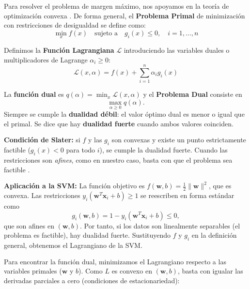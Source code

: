 \documentclass[12pt, a4paper]{article}
\begin{document}
\begin{tcolorbox}[colback=teal!5!white,colframe=teal!75!black,title=\textbf{Nota Teórica: Optimización con Restricciones y Dualidad}]
Para resolver el problema de margen máximo, nos apoyamos en la teoría de optimización convexa \cite{boyd2004convex}. De forma general, el \textbf{Problema Primal} de minimización con restricciones de desigualdad se define como:
\[ \min_{x} f(x) \quad \text{sujeto a} \quad g_i(x) \leq 0, \quad i = 1, \dots, n \]

Definimos la \textbf{Función Lagrangiana} $\mathcal{L}$ introduciendo las variables duales o multiplicadores de Lagrange $\alpha_i \geq 0$:
\[ \mathcal{L}(x, \alpha) = f(x) + \sum_{i=1}^n \alpha_i g_i(x) \]

La \textbf{función dual} es $q(\alpha) = \min_x \mathcal{L}(x, \alpha)$ y el \textbf{Problema Dual} consiste en
\[ \max_{\alpha \geq 0} q(\alpha). \]
Siempre se cumple la \textbf{dualidad débil}: el valor óptimo dual es menor o igual que el primal. Se dice que hay \textbf{dualidad fuerte} cuando ambos valores coinciden.

\textbf{Condición de Slater:} si $f$ y las $g_i$ son convexas y existe un punto estrictamente factible ($g_i(x) < 0$ para todo $i$), se cumple la dualidad fuerte. Cuando las restricciones son \textit{afines}, como en nuestro caso, basta con que el problema sea factible \cite{boyd2004convex}.

\textbf{Aplicación a la SVM:}
La función objetivo es $f(\mathbf{w}, b) = \frac{1}{2}\|\mathbf{w}\|^2$, que es convexa. Las restricciones $y_i(\mathbf{w}^T \mathbf{x}_i + b) \geq 1$ se reescriben en forma estándar como
\[ g_i(\mathbf{w}, b) = 1 - y_i(\mathbf{w}^T \mathbf{x}_i + b) \leq 0, \]
que son afines en $(\mathbf{w}, b)$. Por tanto, si los datos son linealmente separables (el problema es factible), hay dualidad fuerte. Sustituyendo $f$ y $g_i$ en la definición general, obtenemos el Lagrangiano de la SVM.
\end{tcolorbox}

\noindent Para encontrar la función dual, minimizamos el Lagrangiano respecto a las variables primales ($\mathbf{w}$ y $b$). Como $L$ es convexo en $(\mathbf{w}, b)$, basta con igualar las derivadas parciales a cero (condiciones de estacionariedad):
\end{document}
